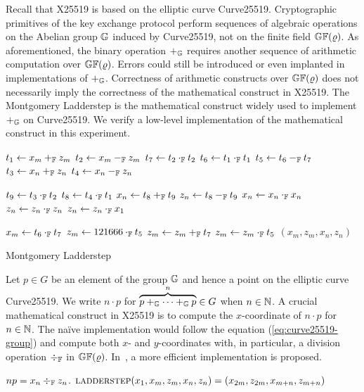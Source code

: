 

Recall that X25519 is based on the elliptic curve Curve25519. 
Cryptographic primitives of the key exchange protocol perform
sequences of algebraic operations on the Abelian group $\mathbb{G}$ induced
by Curve25519, not on the finite field $\mathbb{GF}(\varrho)$. As
aforementioned, the binary operation $+_{\mathbb{G}}$ requires another
sequence of arithmetic computation over $\mathbb{GF}(\varrho)$. Errors
could still be introduced or even implanted in implementations of
$+_{\mathbb{G}}$. Correctness of arithmetic constructs over $\mathbb{GF}(\varrho)$
does not necessarily imply the correctness of the mathematical
construct in X25519. The Montgomery Ladderstep is the mathematical
construct widely used to implement $+_{\mathbb{G}}$ on Curve25519. We 
verify a low-level implementation of the mathematical construct in
this experiment. 

\begin{algorithm}[h]
\label{evaluation:ladder-step:montgomery}
\begin{algorithmic}[1]
\begin{multicols}{3}
\State $t_1 \leftarrow x_m +_{\mathbb{F}} z_m$
\State $t_2 \leftarrow x_m -_{\mathbb{F}} z_m$
\State $t_7 \leftarrow t_2 \cdot_{\mathbb{F}} t_2$
\State $t_6 \leftarrow t_1 \cdot_{\mathbb{F}} t_1$
\State $t_5 \leftarrow t_6 -_{\mathbb{F}} t_7$
\State $t_3 \leftarrow x_n +_{\mathbb{F}} z_n$
\State $t_4 \leftarrow x_n -_{\mathbb{F}} z_n$\rule{0ex}{0ex}
\State $t_9 \leftarrow t_3 \cdot_{\mathbb{F}} t_2$
\State $t_8 \leftarrow t_4 \cdot_{\mathbb{F}} t_1$
\State $x_n \leftarrow t_8 +_{\mathbb{F}} t_9$
\State $z_n \leftarrow t_8 -_{\mathbb{F}} t_9$
\State $x_n \leftarrow x_{n} \cdot_{\mathbb{F}} x_{n}$
\State $z_n \leftarrow z_{n} \cdot_{\mathbb{F}} z_{n}$
\State $z_n \leftarrow z_{n} \cdot_{\mathbb{F}} x_1$\rule{0ex}{0ex} 
\State $x_m \leftarrow t_6 \cdot_{\mathbb{F}} t_7$
\State $z_m \leftarrow 121666 \cdot_{\mathbb{F}} t_5$
\State $z_m \leftarrow z_m +_{\mathbb{F}} t_7$
\State $z_m \leftarrow z_m \cdot_{\mathbb{F}} t_5$
\State \Return $(x_m, z_m, x_n, z_n)$
\EndFunction
\end{multicols}
\end{algorithmic}
\caption{Montgomery Ladderstep}
\end{algorithm}

Let $p \in G$ be an element of the group $\mathbb{G}$ and hence a point on
the elliptic curve Curve25519. We write $n \cdot p$ for
$\overbrace{p +_{\mathbb{G}} \cdots +_{\mathbb{G}} p}^n \in G$ when $n \in \mathbb{N}$. A
crucial mathematical construct in X25519 is to compute the
$x$-coordinate of $n \cdot p$ for $n \in \mathbb{N}$. The na\"ive
implementation would follow the equation (\ref{eq:curve25519-group})
and compute both $x$- and $y$-coordinates with, in particular, a
division operation $\div_{\mathbb{F}}$ in $\mathbb{GF}(\varrho)$. In~\cite{M:87:SPEC},
a more efficient implementation is proposed. 

$np = x_n \div_{\mathbb{F}} z_n$.
$\textsc{ladderstep} (x_1, x_m, z_m, x_n, z_n) = (x_{2m}, z_{2m},
x_{m+n}, z_{m+n})$
 
